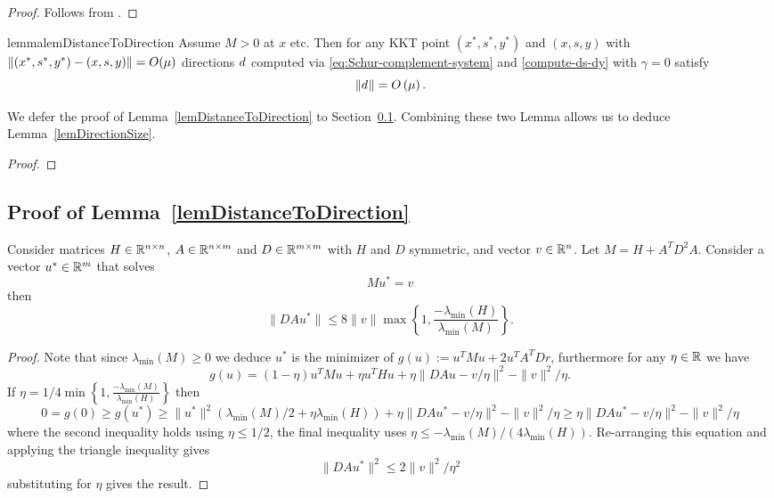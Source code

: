 \documentclass{article}
\begin{document}
\begin{proof}
Follows from \citet{hager1999stability}.
\end{proof}


\begin{restatable}{lemma}{lemDistanceToDirection}\label{lemDistanceToDirection}
Assume $M > 0$ at $x$ etc. Then for any KKT point $(x^{*}, s^{*}, y^{*})$ and $(x,s,y)$ with $\norm{ (x^{*}, s^{*}, y^{*}) - (x,s,y)} = O(\mu)$ directions $d_{}$ computed via \eqref{eq:Schur-complement-system} and \eqref{compute-ds-dy} with  $\gamma = 0$ satisfy 
$$\| d_{} \| = O \left( \mu \right).$$
\end{restatable}


We defer the proof of Lemma~\ref{lemDistanceToDirection} to Section~\ref{sec:lemDistanceToDirection}.
Combining these two Lemma allows us to deduce Lemma~\ref{lemDirectionSize}.

\lemDirectionSize*

\begin{proof}

\end{proof}


\subsection{Proof of Lemma~\ref{lemDistanceToDirection}}\label{sec:lemDistanceToDirection}

\begin{lemma}\label{matrix-bound-lemma}
Consider matrices $H  \in \mathbb{R}^{n \times n}$, $A \in \mathbb{R}^{n \times m}$ and $D \in \mathbb{R}^{m \times m}$ with $H$ and $D$ symmetric, and vector $v \in \mathbb{R}^{n}$. Let $M = H + A^T D^2 A$. Consider a vector $u^{*} \in \mathbb{R}^{m}$ that solves
$$
M u^{*} =  v
$$
then 
$$\| D A u^{*} \| \le 8 \| v \| \max\left\{1, \frac{- \lambda_{\min}(H)}{\lambda_{\min}(M)} \right\}.$$
\end{lemma}

\begin{proof}
Note that since $\lambda_{\min}(M) \ge 0$ we deduce $u^{*}$ is the minimizer of $g(u) := u^T M u +  2 u^T A^T D r$, furthermore for any $\eta \in \mathbb{R}$ we have
$$
g(u)  = (1 - \eta) u^T M u + \eta u^T H u + \eta \| D A u -  v / \eta \|^2 - \| v \|^2 / \eta.
$$
If $\eta = 1/4 \min\left\{1,  \frac{-  \lambda_{\min}(M)}{\lambda_{\min}(H)} \right\}$ then
$$
0 = g(0) \ge g(u^{*}) \ge \| u^{*} \|^2 ( \lambda_{\min}(M) / 2 + \eta \lambda_{\min}(H) ) + \eta \| D A u^{*}  -  v / \eta \|^2 - \| v \|^2 / \eta \ge   \eta \| D A u^{*}  -  v / \eta \|^2  - \| v \|^2 / \eta 
$$
where the second inequality holds using $\eta \le 1/2$, the final inequality uses $\eta \le -\lambda_{\min}(M) / (4 \lambda_{\min}(H))$. Re-arranging this equation and applying the triangle inequality gives
$$
\| D A u^{*} \|^2 \le 2 \| v \|^2 / \eta^2
$$
substituting for $\eta$ gives the result.
\end{proof}
\end{document}
